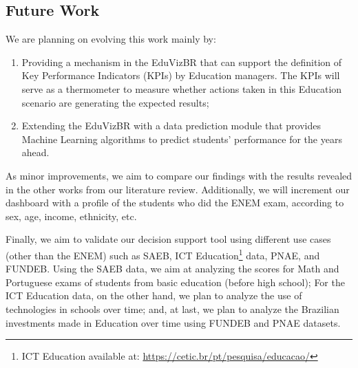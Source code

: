 \documentclass[12pt]{article}
\begin{document}
\subsection{Future Work} 

We are planning on evolving this work mainly by: 
\begin{enumerate}
    \item Providing a mechanism in the EduVizBR that can support the definition of Key Performance Indicators (KPIs) by Education managers. The KPIs will serve as a thermometer to measure whether actions taken in this Education scenario are generating the expected results;
    \item Extending the EduVizBR with a data prediction module that provides Machine Learning algorithms to predict students' performance for the years ahead.
\end{enumerate}

As minor improvements, we aim to compare our findings with the results revealed in the other works from our literature review. Additionally, we will increment our dashboard with a profile of the students who did the ENEM exam, according to sex, age, income, ethnicity, etc.

Finally, we aim to validate our decision support tool using different use cases (other than the ENEM) such as SAEB, ICT Education\footnote{ICT Education available at: \url{https://cetic.br/pt/pesquisa/educacao/}} data, PNAE, and FUNDEB. Using the SAEB data, we aim at analyzing the scores for Math and Portuguese exams of students from basic education (before high school); For the ICT Education data, on the other hand, we plan to analyze the use of technologies in schools over time; and, at last, we plan to analyze the Brazilian investments made in Education over time using FUNDEB and PNAE datasets.





\end{document}
